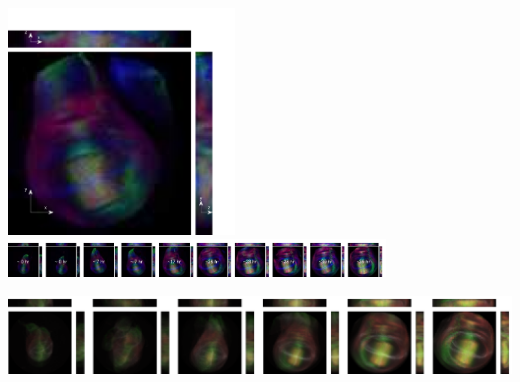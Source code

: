 \documentclass[10pt]{article}
\begin{document}
\includegraphics[width=6cm]{wing_disc_example}
%
\hfill
%
\includegraphics[width=10cm]{wing_disc_ordered}

\vspace{0.25cm}
\includegraphics[width=17.5cm]{wing_disc_average}
\end{document}
